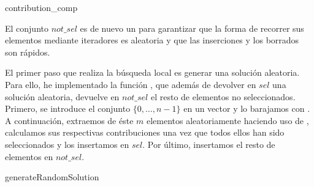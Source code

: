 \documentclass[10pt,a4paper]{article}
\begin{document}
\begin{algorithm}
	\caption{contribution\_comp}
\end{algorithm}

El conjunto $not\_sel$ es de nuevo un  para garantizar que la forma de recorrer sus elementos mediante iteradores es aleatoria y que las inserciones y los borrados son rápidos.

El primer paso que realiza la búsqueda local es generar una solución aleatoria. Para ello, he implementado la función , que además de devolver en $sel$ una solución aleatoria, devuelve en $not\_sel$ el resto de elementos no seleccionados. Primero, se introduce el conjunto $\{0,\dots,n-1\}$ en un vector y lo barajamos con . A continuación, extraemos de éste $m$ elementos aleatoriamente haciendo uso de , calculamos sus respectivas contribuciones una vez que todos ellos han sido seleccionados y los insertamos en $sel$. Por último, insertamos el resto de elementos en $not\_sel$.

\begin{algorithm}
	\caption{generateRandomSolution}
\end{algorithm}
\end{document}
